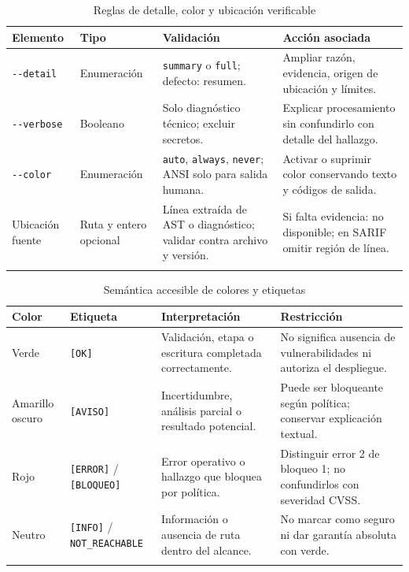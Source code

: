 \begin{table}[H]
\centering\small{}
\caption{Reglas de detalle, color y ubicación verificable}
\begin{tabularx}{\textwidth}{P{2.6cm}P{2.2cm}YY}
\toprule
\textbf{Elemento} & \textbf{Tipo} & \textbf{Validación} & \textbf{Acción asociada} \\
\midrule
\texttt{-\allowbreak -\allowbreak detail} & Enumeración & \texttt{summary} o \texttt{full}; defecto: resumen. & Ampliar razón, evidencia, origen de ubicación y límites. \\
\addlinespace
\texttt{-\allowbreak -\allowbreak verbose} & Booleano & Solo diagnóstico técnico; excluir secretos. & Explicar procesamiento sin confundirlo con detalle del hallazgo. \\
\addlinespace
\texttt{-\allowbreak -\allowbreak color} & Enumeración & \texttt{auto}, \texttt{always}, \texttt{never}; ANSI solo para salida humana. & Activar o suprimir color conservando texto y códigos de salida. \\
\addlinespace
Ubicación fuente & Ruta y entero opcional & Línea extraída de AST o diagnóstico; validar contra archivo y versión. & Si falta evidencia: no disponible; en SARIF omitir región de línea. \\
\addlinespace
\bottomrule
\end{tabularx}
\end{table}

\begin{table}[H]
\centering\small{}
\caption{Semántica accesible de colores y etiquetas}
\begin{tabularx}{\textwidth}{P{2.3cm}P{3cm}YY}
\toprule
\textbf{Color} & \textbf{Etiqueta} & \textbf{Interpretación} & \textbf{Restricción} \\
\midrule
Verde & \texttt{[OK]} & Validación, etapa o escritura completada correctamente. & No significa ausencia de vulnerabilidades ni autoriza el despliegue. \\
\addlinespace
Amarillo oscuro & \texttt{[AVISO]} & Incertidumbre, análisis parcial o resultado potencial. & Puede ser bloqueante según política; conservar explicación textual. \\
\addlinespace
Rojo & \texttt{[ERROR]} / \texttt{[BLOQUEO]} & Error operativo o hallazgo que bloquea por política. & Distinguir error 2 de bloqueo 1; no confundirlos con severidad CVSS. \\
\addlinespace
Neutro & \texttt{[INFO]} / \texttt{NOT\_\allowbreak REACHABLE} & Información o ausencia de ruta dentro del alcance. & No marcar como seguro ni dar garantía absoluta con verde. \\
\addlinespace
\bottomrule
\end{tabularx}
\end{table}

